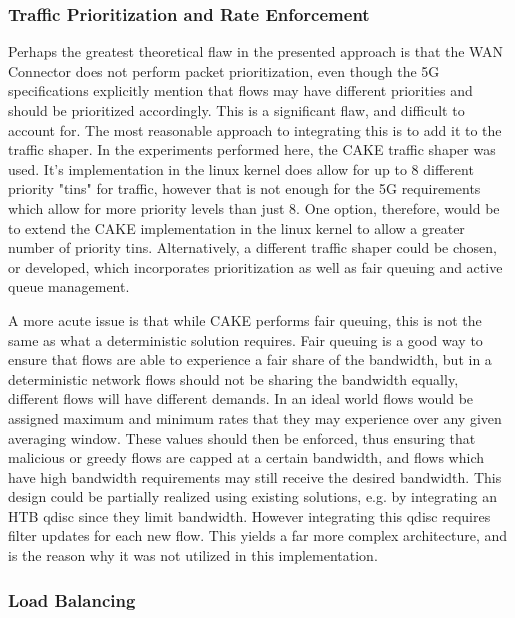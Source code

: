 \subsubsection{Traffic Prioritization and Rate Enforcement}

Perhaps the greatest theoretical flaw in the presented approach is that the WAN Connector does not perform packet prioritization, even though the 5G specifications explicitly mention that flows may have different priorities and should be prioritized accordingly. This is a significant flaw, and difficult to account for. The most reasonable approach to integrating this is to add it to the traffic shaper. In the experiments performed here, the CAKE traffic shaper was used. It's implementation in the linux kernel does allow for up to 8 different priority 
"tins" for traffic, however that is not enough for the 5G requirements which allow for more priority levels than just 8. One option, therefore, would be to extend the CAKE implementation in the linux kernel to allow a greater number of priority tins. Alternatively, a different traffic shaper could be chosen, or developed, which incorporates prioritization as well as fair queuing and active queue management.

A more acute issue is that while CAKE performs fair queuing, this is not the same as what a deterministic solution requires. Fair queuing is a good way to ensure that flows are able to experience a fair share of the bandwidth, but in a deterministic network flows should not be sharing the bandwidth equally, different flows will have different demands. In an ideal world flows would be assigned maximum and minimum rates  that they may experience over any given averaging window. These values should then be enforced, thus ensuring that malicious or greedy flows are capped at a certain bandwidth, and flows which have high bandwidth requirements may still receive the desired bandwidth. This design could be partially realized using existing solutions, e.g. by integrating an HTB qdisc since they limit bandwidth. However integrating this qdisc requires filter updates for each new flow. This yields a far more complex architecture, and is the reason why it was not utilized in this implementation.

\subsubsection{Load Balancing}


